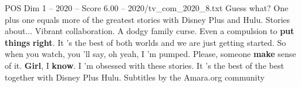 \begin{textsample}{POS Dim 1 – 2020 – Score 6.00 – 2020/tv\_com\_2020\_8.txt}  \label{ex:f1_pos_081}
Guess what?
One plus one equals more of the greatest stories with Disney Plus and Hulu.
Stories about...
Vibrant collaboration.
A dodgy family curse.
Even a compulsion to \textbf{put} \textbf{things} \textbf{right}.
It 's the best of both worlds and we are just getting started.
So when you watch, you 'll say, oh yeah, I 'm pumped.
Please, someone \textbf{make} sense of it. \textbf{Girl}, I \textbf{know}.
I 'm obsessed with these stories.
It 's the best of the best together with Disney Plus Hulu.
Subtitles by the Amara.org community

\end{textsample}
